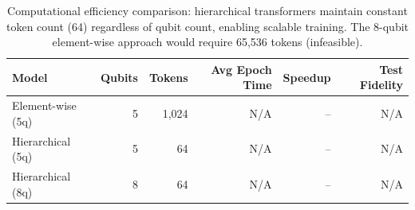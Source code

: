 \begin{table}[h]
\centering
\begin{tabular}{lrrrrr}
\toprule
Model & Qubits & Tokens & Avg Epoch Time & Speedup & Test Fidelity \\
\midrule
Element-wise (5q) & 5 & 1,024 & N/A & -- & N/A \\
Hierarchical (5q) & 5 & 64 & N/A & -- & N/A \\
Hierarchical (8q) & 8 & 64 & N/A & -- & N/A \\
\bottomrule
\end{tabular}
\caption{Computational efficiency comparison: hierarchical transformers maintain constant token count (64) regardless of qubit count, enabling scalable training. The 8-qubit element-wise approach would require 65,536 tokens (infeasible).}
\label{tab:timing_comparison}
\end{table}